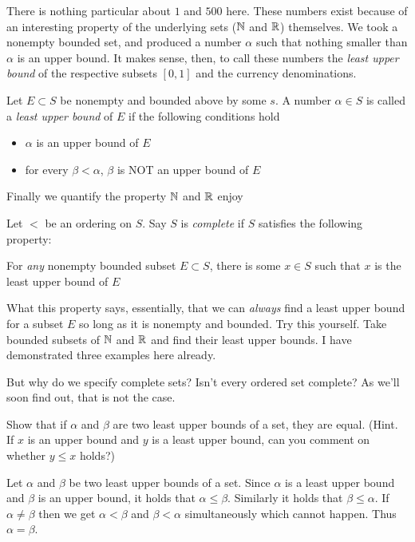 There is nothing particular about $1$ and $500$ here. These numbers exist because of an interesting property of the underlying sets ($\mathbb{N}$ and $\mathbb{R}$) themselves. We took a nonempty bounded set, and produced a number $\alpha$ such that nothing smaller than $\alpha$ is an upper bound. It makes sense, then, to call these numbers the \emph{least upper bound} of the respective subsets $[0, 1]$ and the currency denominations. 

\begin{SNP}{\dfn}{Let $E \subset S$ be nonempty and bounded above by some $s$. A number $\alpha \in S$ is called a \emph{least upper bound} of $E$ if the following conditions hold
\begin{itemize}
	\item $\alpha$ is an upper bound of $E$
	\item for every $\beta < \alpha$, $\beta$ is NOT an upper bound of $E$
\end{itemize}}
\end{SNP}

Finally we quantify the property $\mathbb{N}$ and $\mathbb{R}$ enjoy

\begin{SNP}
{\dfn}{Let $<$ be an ordering on $S$. Say $S$ is \emph{complete} if $S$ satisfies the following property:

For \emph{any} nonempty bounded subset $E \subset S$, there is some $x \in S$ such that $x$ is the least upper bound of $E$}
\end{SNP}

What this property says, essentially, that we can \emph{always} find a least upper bound for a subset $E$ so long as it is nonempty and bounded. Try this yourself. Take bounded subsets of $\mathbb{N}$ and $\mathbb{R}$ and find their least upper bounds. I have demonstrated three examples here already.

But why do we specify complete sets? Isn't every ordered set complete? As we'll soon find out, that is not the case.

\begin{SNP}
{\ex}{Show that if $\alpha$ and $\beta$ are two least upper bounds of a set, they are equal. (Hint. If $x$ is an upper bound and $y$ is a least upper bound, can you comment on whether $y \leq x$ holds?)}
\end{SNP}

\AnswerSection
\ans Let $\alpha$ and $\beta$ be two least upper bounds of a set. Since $\alpha$ is a least upper bound and $\beta$ is an upper bound, it holds that $\alpha \leq \beta$. Similarly it holds that $\beta \leq \alpha$. If $\alpha \neq \beta$ then we get $\alpha < \beta$ and $\beta < \alpha$ simultaneously which cannot happen. Thus $\alpha = \beta$.

